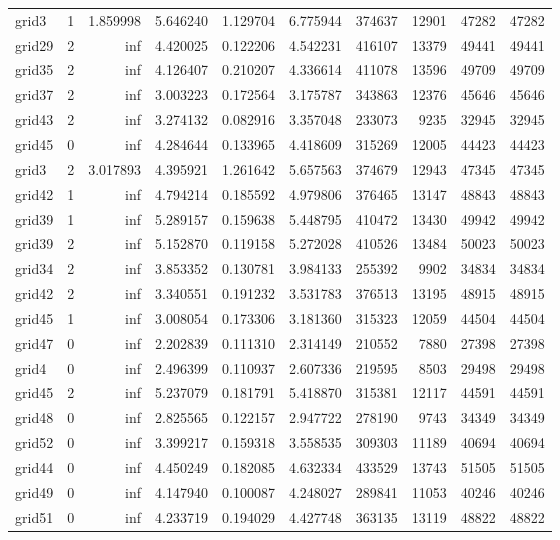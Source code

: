 \begin{longtable}{|l|r|r|r|r|r|r|r|r|r|}
grid3 & 1 & 1.859998 & 5.646240 & 1.129704 & 6.775944 & 374637 & 12901 & 47282 & 47282 \\
grid29 & 2 & inf & 4.420025 & 0.122206 & 4.542231 & 416107 & 13379 & 49441 & 49441 \\
grid35 & 2 & inf & 4.126407 & 0.210207 & 4.336614 & 411078 & 13596 & 49709 & 49709 \\
grid37 & 2 & inf & 3.003223 & 0.172564 & 3.175787 & 343863 & 12376 & 45646 & 45646 \\
grid43 & 2 & inf & 3.274132 & 0.082916 & 3.357048 & 233073 & 9235 & 32945 & 32945 \\
grid45 & 0 & inf & 4.284644 & 0.133965 & 4.418609 & 315269 & 12005 & 44423 & 44423 \\
grid3 & 2 & 3.017893 & 4.395921 & 1.261642 & 5.657563 & 374679 & 12943 & 47345 & 47345 \\
grid42 & 1 & inf & 4.794214 & 0.185592 & 4.979806 & 376465 & 13147 & 48843 & 48843 \\
grid39 & 1 & inf & 5.289157 & 0.159638 & 5.448795 & 410472 & 13430 & 49942 & 49942 \\
grid39 & 2 & inf & 5.152870 & 0.119158 & 5.272028 & 410526 & 13484 & 50023 & 50023 \\
grid34 & 2 & inf & 3.853352 & 0.130781 & 3.984133 & 255392 & 9902 & 34834 & 34834 \\
grid42 & 2 & inf & 3.340551 & 0.191232 & 3.531783 & 376513 & 13195 & 48915 & 48915 \\
grid45 & 1 & inf & 3.008054 & 0.173306 & 3.181360 & 315323 & 12059 & 44504 & 44504 \\
grid47 & 0 & inf & 2.202839 & 0.111310 & 2.314149 & 210552 & 7880 & 27398 & 27398 \\
grid4 & 0 & inf & 2.496399 & 0.110937 & 2.607336 & 219595 & 8503 & 29498 & 29498 \\
grid45 & 2 & inf & 5.237079 & 0.181791 & 5.418870 & 315381 & 12117 & 44591 & 44591 \\
grid48 & 0 & inf & 2.825565 & 0.122157 & 2.947722 & 278190 & 9743 & 34349 & 34349 \\
grid52 & 0 & inf & 3.399217 & 0.159318 & 3.558535 & 309303 & 11189 & 40694 & 40694 \\
grid44 & 0 & inf & 4.450249 & 0.182085 & 4.632334 & 433529 & 13743 & 51505 & 51505 \\
grid49 & 0 & inf & 4.147940 & 0.100087 & 4.248027 & 289841 & 11053 & 40246 & 40246 \\
grid51 & 0 & inf & 4.233719 & 0.194029 & 4.427748 & 363135 & 13119 & 48822 & 48822 \\

\end{longtable}
